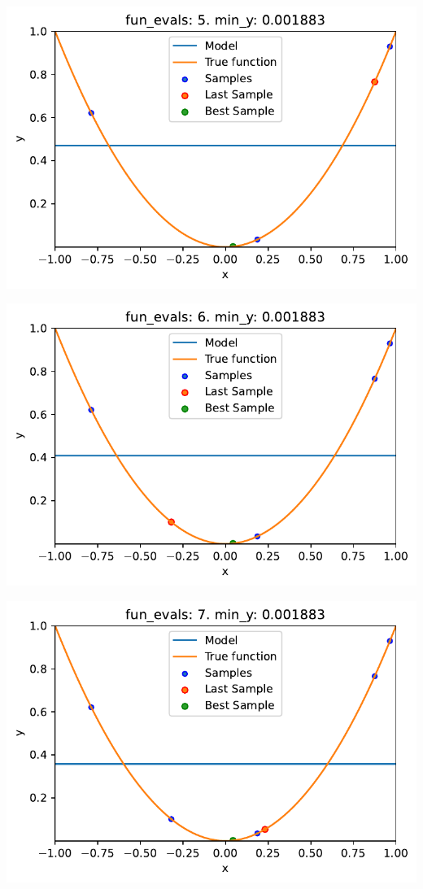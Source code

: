 \documentclass[
  letterpaper,
  DIV=11,
  numbers=noendperiod]{scrreprt}
\begin{document}
\includegraphics{010_num_spot_sklearn_surrogate_files/figure-pdf/cell-43-output-4.pdf}

\includegraphics{010_num_spot_sklearn_surrogate_files/figure-pdf/cell-43-output-5.pdf}

\includegraphics{010_num_spot_sklearn_surrogate_files/figure-pdf/cell-43-output-6.pdf}
\end{document}
